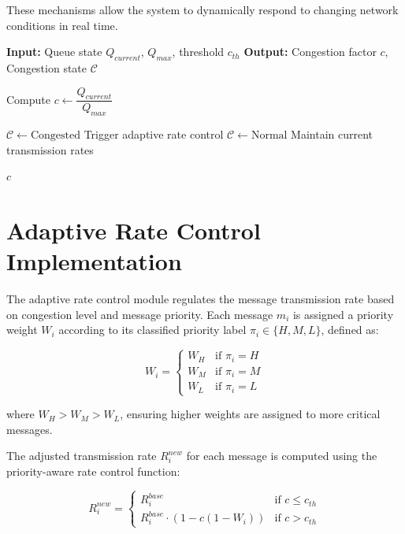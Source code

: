 These mechanisms allow the system to dynamically respond to 
changing network conditions in real time.

\begin{algorithm}[H]
\caption{Congestion Level Estimation}
\begin{algorithmic}[1]
\State \textbf{Input:} Queue state $Q_{current}$, $Q_{max}$, threshold $c_{th}$
\State \textbf{Output:} Congestion factor $c$, Congestion state $\mathcal{C}$

\State Compute $c \leftarrow \dfrac{Q_{current}}{Q_{max}}$

    \State $\mathcal{C} \leftarrow \text{Congested}$
    \State Trigger adaptive rate control
\Else
    \State $\mathcal{C} \leftarrow \text{Normal}$
    \State Maintain current transmission rates
\EndIf

\State \Return $c$

\end{algorithmic}
\end{algorithm}

\section{Adaptive Rate Control Implementation}

The adaptive rate control module regulates the message transmission 
rate based on congestion level and message priority. Each message 
$m_i$ is assigned a priority weight $W_i$ according to its 
classified priority label $\pi_i \in \{H, M, L\}$, defined as:

\begin{equation}
W_i = 
\begin{cases}
W_H & \text{if } \pi_i = H \\
W_M & \text{if } \pi_i = M \\
W_L & \text{if } \pi_i = L
\end{cases}
\label{eq:priority_weight}
\end{equation}

\noindent where $W_H > W_M > W_L$, ensuring higher weights are 
assigned to more critical messages.

The adjusted transmission rate $R_i^{new}$ for each message is 
computed using the priority-aware rate control function:

\begin{equation}
R_i^{new} = 
\begin{cases}
R_i^{base} & \text{if } c \leq c_{th} \\
R_i^{base} \cdot \left(1 - c\left(1 - W_i\right)\right) & \text{if } c > c_{th}
\end{cases}
\label{eq:rate_control}
\end{equation}

